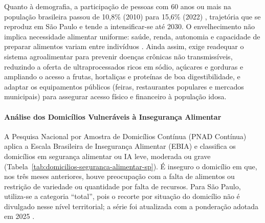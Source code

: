 \documentclass[
	12pt,				%
	openright,			%
	oneside,			%
	a4paper,			%
	chapter=TITLE,		%
	section=TITLE,		%
	english,			%
	french,				%
	spanish,			%
	brazil,				%
 ]{abntex2}
\begin{document}
Quanto à demografia, a participação de pessoas com 60 anos ou mais na
população brasileira passou de 10,8\% (2010) para 15,6\% (2022)
\cite{ibge_censo2022}, trajetória que se reproduz em São Paulo e tende a
intensificar-se até 2030. O envelhecimento não implica necessidade
alimentar uniforme: saúde, renda, autonomia e capacidade de preparar alimentos
variam entre indivíduos \cite{who_ageing}. Ainda assim, exige readequar o
sistema agroalimentar para prevenir doenças crônicas não transmissíveis,
reduzindo a oferta de ultraprocessados ricos em sódio, açúcares e gorduras e
ampliando o acesso a frutas, hortaliças e proteínas de boa digestibilidade, e
adaptar os equipamentos públicos (feiras, restaurantes populares e mercados
municipais) para assegurar acesso físico e financeiro à população idosa.

\paragraph{Análise dos Domicílios Vulneráveis à Insegurança Alimentar}
A Pesquisa Nacional por Amostra de Domicílios Contínua (PNAD Contínua) aplica a
Escala Brasileira de Insegurança Alimentar (EBIA) e classifica os domicílios
em segurança alimentar ou IA leve, moderada ou grave
(Tabela~\ref{tab:domicilios-seguranca-alimentar-sp}). É inseguro o domicílio
em que, nos três meses anteriores, houve preocupação com a falta de alimentos
ou restrição de variedade ou quantidade por falta de recursos. Para São Paulo,
utiliza-se a categoria ``total'', pois o recorte por situação do domicílio não
é divulgado nesse nível territorial; a série foi atualizada com a ponderação
adotada em 2025 \cite{ibge_pnadc2024a}.
\end{document}
